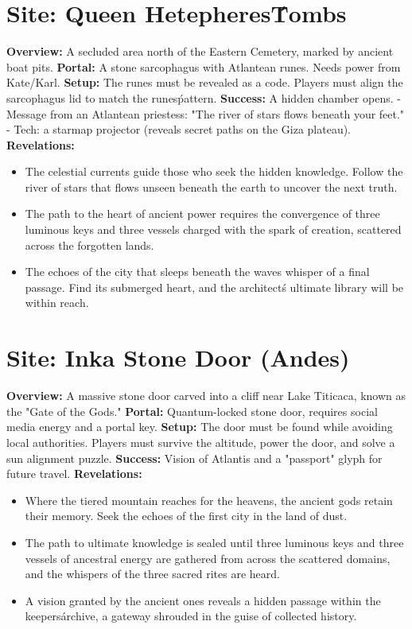 \documentclass[12pt]{article}
\begin{document}
\section*{Site: Queen Hetepheres\' Tombs}
\textbf{Overview:}
A secluded area north of the Eastern Cemetery, marked by ancient boat pits.
\textbf{Portal:}
A stone sarcophagus with Atlantean runes. Needs power from Kate/Karl.
\textbf{Setup:}
The runes must be revealed as a code. Players must align the sarcophagus lid to match the runes\' pattern.
\textbf{Success:}
A hidden chamber opens.
- Message from an Atlantean priestess: "The river of stars flows beneath your feet."
- Tech: a starmap projector (reveals secret paths on the Giza plateau).
\textbf{Revelations:}
\begin{itemize}
  \item The celestial currents guide those who seek the hidden knowledge. Follow the river of stars that flows unseen beneath the earth to uncover the next truth.
  \item The path to the heart of ancient power requires the convergence of three luminous keys and three vessels charged with the spark of creation, scattered across the forgotten lands.
  \item The echoes of the city that sleeps beneath the waves whisper of a final passage. Find its submerged heart, and the architect\'s ultimate library will be within reach.
\end{itemize}

\hrulefill

\section*{Site: Inka Stone Door (Andes)}
\textbf{Overview:}
A massive stone door carved into a cliff near Lake Titicaca, known as the "Gate of the Gods."
\textbf{Portal:}
Quantum-locked stone door, requires social media energy and a portal key.
\textbf{Setup:}
The door must be found while avoiding local authorities. Players must survive the altitude, power the door, and solve a sun alignment puzzle.
\textbf{Success:}
Vision of Atlantis and a "passport" glyph for future travel.
\textbf{Revelations:}
\begin{itemize}
  \item Where the tiered mountain reaches for the heavens, the ancient gods retain their memory. Seek the echoes of the first city in the land of dust.
  \item The path to ultimate knowledge is sealed until three luminous keys and three vessels of ancestral energy are gathered from across the scattered domains, and the whispers of the three sacred rites are heard.
  \item A vision granted by the ancient ones reveals a hidden passage within the keepers\' archive, a gateway shrouded in the guise of collected history.
\end{itemize}
\end{document}
